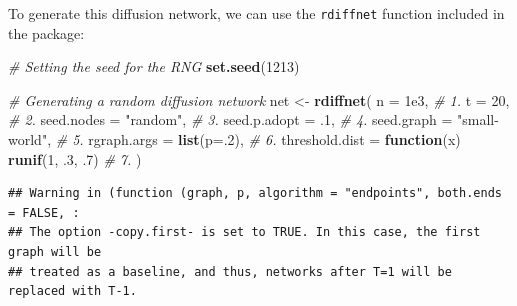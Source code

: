 \documentclass[
]{book}
\newenvironment{Shaded}{\begin{snugshade}}{\end{snugshade}}
\newcommand{\AttributeTok}[1]{\textcolor[rgb]{0.13,0.29,0.53}{#1}}
\newcommand{\CommentTok}[1]{\textcolor[rgb]{0.56,0.35,0.01}{\textit{#1}}}
\newcommand{\ControlFlowTok}[1]{\textcolor[rgb]{0.13,0.29,0.53}{\textbf{#1}}}
\newcommand{\DecValTok}[1]{\textcolor[rgb]{0.00,0.00,0.81}{#1}}
\newcommand{\FloatTok}[1]{\textcolor[rgb]{0.00,0.00,0.81}{#1}}
\newcommand{\FunctionTok}[1]{\textcolor[rgb]{0.13,0.29,0.53}{\textbf{#1}}}
\newcommand{\NormalTok}[1]{#1}
\newcommand{\OtherTok}[1]{\textcolor[rgb]{0.56,0.35,0.01}{#1}}
\newcommand{\StringTok}[1]{\textcolor[rgb]{0.31,0.60,0.02}{#1}}
\begin{document}
To generate this diffusion network, we can use the \texttt{rdiffnet} function included in the package:

\begin{Shaded}
\begin{Highlighting}[]
\CommentTok{\# Setting the seed for the RNG}
\FunctionTok{set.seed}\NormalTok{(}\DecValTok{1213}\NormalTok{)}

\CommentTok{\# Generating a random diffusion network}
\NormalTok{net }\OtherTok{\textless{}{-}} \FunctionTok{rdiffnet}\NormalTok{(}
  \AttributeTok{n              =} \FloatTok{1e3}\NormalTok{,                         }\CommentTok{\# 1.}
  \AttributeTok{t              =} \DecValTok{20}\NormalTok{,                          }\CommentTok{\# 2.}
  \AttributeTok{seed.nodes     =} \StringTok{"random"}\NormalTok{,                    }\CommentTok{\# 3.}
  \AttributeTok{seed.p.adopt   =}\NormalTok{ .}\DecValTok{1}\NormalTok{,                          }\CommentTok{\# 4.}
  \AttributeTok{seed.graph     =} \StringTok{"small{-}world"}\NormalTok{,               }\CommentTok{\# 5.}
  \AttributeTok{rgraph.args    =} \FunctionTok{list}\NormalTok{(}\AttributeTok{p=}\NormalTok{.}\DecValTok{2}\NormalTok{),                  }\CommentTok{\# 6.}
  \AttributeTok{threshold.dist =} \ControlFlowTok{function}\NormalTok{(x) }\FunctionTok{runif}\NormalTok{(}\DecValTok{1}\NormalTok{, .}\DecValTok{3}\NormalTok{, .}\DecValTok{7}\NormalTok{) }\CommentTok{\# 7.}
\NormalTok{  )}
\end{Highlighting}
\end{Shaded}

\begin{verbatim}
## Warning in (function (graph, p, algorithm = "endpoints", both.ends = FALSE, :
## The option -copy.first- is set to TRUE. In this case, the first graph will be
## treated as a baseline, and thus, networks after T=1 will be replaced with T-1.
\end{verbatim}
\end{document}
